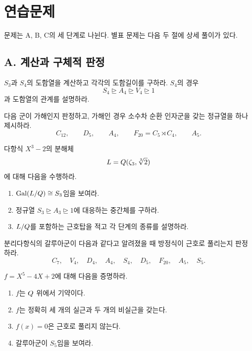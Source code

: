\clearpage
\section{연습문제}
\label{sec:radicals-solvable-exercises}

문제는 A, B, C의 세 단계로 나뉜다. 별표 문제는 다음 두 절에 상세 풀이가 있다.

\subsection*{A. 계산과 구체적 판정}

\begin{exercise}[*]
$S_3$과 $S_4$의 도함열을 계산하고 각각의 도함길이를 구하라. $S_4$의 경우
\[
  S_4\trianglerighteq A_4\trianglerighteq V_4
  \trianglerighteq1
\]
과 도함열의 관계를 설명하라.
\end{exercise}

\begin{exercise}
다음 군이 가해인지 판정하고, 가해인 경우 소수차 순환 인자군을 갖는 정규열을 하나 제시하라.
\[
  C_{12},\qquad D_5,\qquad A_4,
  \qquad F_{20}=C_5\rtimes C_4,
  \qquad A_5.
\]
\end{exercise}

\begin{exercise}[*]
다항식 $X^3-2$의 분해체
\[
  L=Q(\zeta_3,\sqrt[3]{2})
\]
에 대해 다음을 수행하라.
\begin{enumerate}[label=(\alph*)]
  \item $\operatorname{Gal}(L/Q)\cong S_3$임을 보여라.
  \item 정규열 $S_3\trianglerighteq A_3\trianglerighteq1$에 대응하는 중간체를 구하라.
  \item $L/Q$를 포함하는 근호탑을 적고 각 단계의 종류를 설명하라.
\end{enumerate}
\end{exercise}

\begin{exercise}
분리다항식의 갈루아군이 다음과 같다고 알려졌을 때 방정식이 근호로 풀리는지 판정하라.
\[
  C_7,\quad V_4,\quad D_4,\quad A_4,\quad S_4,
  \quad D_5,\quad F_{20},\quad A_5,\quad S_5.
\]
\end{exercise}

\begin{exercise}[*]
$f=X^5-4X+2$에 대해 다음을 증명하라.
\begin{enumerate}[label=(\alph*)]
  \item $f$는 $Q$ 위에서 기약이다.
  \item $f$는 정확히 세 개의 실근과 두 개의 비실근을 갖는다.
  \item $f(x)=0$은 근호로 풀리지 않는다.
  \item 갈루아군이 $S_5$임을 보여라.
\end{enumerate}
\end{exercise}


